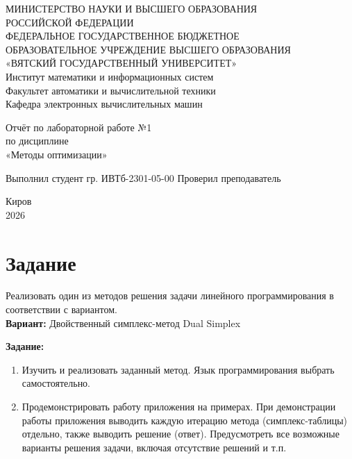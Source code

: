 \documentclass[oneside,a4paper,14pt]{extarticle}
\begin{document}
\newpage\thispagestyle{empty}
\begin{center}
	МИНИСТЕРСТВО НАУКИ И ВЫСШЕГО ОБРАЗОВАНИЯ\\
	РОССИЙСКОЙ ФЕДЕРАЦИИ\\
	ФЕДЕРАЛЬНОЕ ГОСУДАРСТВЕННОЕ БЮДЖЕТНОЕ\\
	ОБРАЗОВАТЕЛЬНОЕ УЧРЕЖДЕНИЕ ВЫСШЕГО ОБРАЗОВАНИЯ\\
	«ВЯТСКИЙ ГОСУДАРСТВЕННЫЙ УНИВЕРСИТЕТ»\\
	Институт математики и информационных систем\\
	Факультет автоматики и вычислительной техники\\
	Кафедра электронных вычислительных машин
\end{center}
\vspace{20mm}
\begin{center}
	Отчёт по лабораторной работе №1\\
	по дисциплине\\
	«Методы оптимизации»\\
\end{center}
\vfill
Выполнил студент гр. ИВТб-2301-05-00 \hfill
{}
Проверил преподаватель\hfill
{}
\vfill
\begin{center}
	Киров\\
	2026
\end{center}
\newpage
\setcounter{page}{1}
\tableofcontents
\newpage

\section*{Задание}
Реализовать один из методов решения задачи линейного программирования в соответствии с вариантом.\\

\textbf{Вариант:} Двойственный симплекс-метод Dual Simplex

\textbf{Задание:}
\begin{enumerate}
	\item Изучить и реализовать заданный метод. Язык программирования выбрать самостоятельно.
	\item Продемонстрировать работу приложения на примерах. При демонстрации работы приложения выводить каждую итерацию метода (симплекс-таблицы) отдельно, также выводить решение (ответ). Предусмотреть все возможные варианты решения задачи, включая отсутствие решений и т.п.
\end{enumerate}
\end{document}

